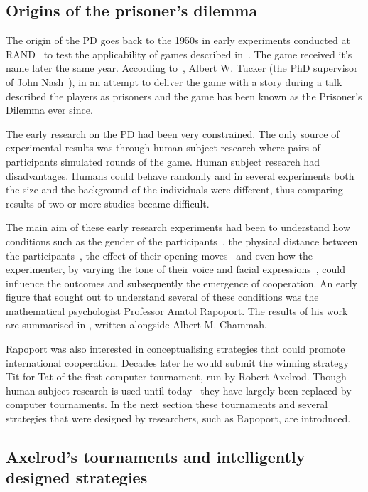 \documentclass{article}
\theoremstyle{definition}
\begin{document}
\subsection{Origins of the prisoner's dilemma}\label{section:origin}

The origin of the PD goes back to the 1950s in early experiments conducted at
RAND~\cite{Flood1958} to test the applicability of games described
in~\cite{VonNeumann1944}. The game received it's name later the same year.
According to~\cite{Tucker1983}, Albert W. Tucker (the PhD supervisor of John
Nash~\cite{Nash1951}), in an attempt to deliver the game with a story during a
talk described the players as prisoners and the game has been known as the
Prisoner's Dilemma ever since.

The early research on the PD had been very constrained. The only source of
experimental results was through human subject research where pairs of
participants simulated rounds of the game. Human subject research had
disadvantages. Humans could behave randomly and in several experiments both the
size and the background of the individuals were different, thus comparing
results of two or more studies became difficult.

The main aim of these early research experiments had been to understand how
conditions such as the gender of the participants~\cite{Evans1966, Lutzker1961,
Mack1971}, the physical distance between the participants~\cite{Sensenig1972}, the
effect of their opening moves~\cite{Tedeschi1968} and even how the experimenter, by varying
the tone of their voice and facial expressions~\cite{Gallo1968}, could influence
the outcomes and subsequently the emergence of cooperation. An early figure that
sought out to understand several of these conditions was the mathematical
psychologist Professor Anatol Rapoport. The results of his work are summarised
in \cite{rapoport1965}, written alongside Albert M. Chammah.

Rapoport was also interested in conceptualising strategies that could promote
international cooperation. Decades later he would submit the winning strategy
Tit for Tat of the first computer tournament, run by Robert Axelrod. Though
human subject research is used until today~\cite{Testori2019} they have largely
been replaced by computer tournaments. In the next section  these tournaments
and several strategies that were designed by researchers, such as Rapoport, are
introduced.

\subsection{Axelrod's tournaments and intelligently designed strategies}
\label{subsection:intelligent_design}
\end{document}

